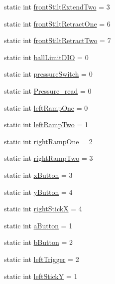 \begin{DoxyCompactItemize}
\item 
static int \hyperlink{classfrc_1_1robot_1_1_robot_map_adaf591568f35bfea428a0daef88d2bd7}{front\+Stilt\+Extend\+Two} = 3
\item 
static int \hyperlink{classfrc_1_1robot_1_1_robot_map_ac14d6b81afe55b4563fc122101e5d2a1}{front\+Stilt\+Retract\+One} = 6
\item 
static int \hyperlink{classfrc_1_1robot_1_1_robot_map_a5c84f2be7047952afe472026a81a71db}{front\+Stilt\+Retract\+Two} = 7
\item 
static int \hyperlink{classfrc_1_1robot_1_1_robot_map_a83f3eec03443af1dbe44492871796c92}{ball\+Limit\+D\+IO} = 0
\item 
static int \hyperlink{classfrc_1_1robot_1_1_robot_map_a845df2a269757c4988d8a7b4721ae9a6}{pressure\+Switch} = 0
\item 
static int \hyperlink{classfrc_1_1robot_1_1_robot_map_a10cc39db919c29133e2bc774281804b0}{Pressure\+\_\+read} = 0
\item 
static int \hyperlink{classfrc_1_1robot_1_1_robot_map_a628344048ec6bcb92c77be8e100d793a}{left\+Ramp\+One} = 0
\item 
static int \hyperlink{classfrc_1_1robot_1_1_robot_map_a8fe9ced14f786602722d0f571264364a}{left\+Ramp\+Two} = 1
\item 
static int \hyperlink{classfrc_1_1robot_1_1_robot_map_a5858c523e9d55496c5879e1605dd8d09}{right\+Ramp\+One} = 2
\item 
static int \hyperlink{classfrc_1_1robot_1_1_robot_map_a3b1dd0a30fea76ff6841bc16dca555ae}{right\+Ramp\+Two} = 3
\item 
static int \hyperlink{classfrc_1_1robot_1_1_robot_map_a563500240643659a777b4b64d648a57f}{x\+Button} = 3
\item 
static int \hyperlink{classfrc_1_1robot_1_1_robot_map_a376cdfce24713ccddfd9ea4a9ae83772}{y\+Button} = 4
\item 
static int \hyperlink{classfrc_1_1robot_1_1_robot_map_aed812a060e454b3406124a8a8ec95e15}{right\+StickX} = 4
\item 
static int \hyperlink{classfrc_1_1robot_1_1_robot_map_add774938fbf6b4cddcd06d376de27513}{a\+Button} = 1
\item 
static int \hyperlink{classfrc_1_1robot_1_1_robot_map_abb2f8a028f422a7e8713d4be96075ce2}{b\+Button} = 2
\item 
static int \hyperlink{classfrc_1_1robot_1_1_robot_map_a712cd18ea686d732a170689f16882f47}{left\+Trigger} = 2
\item 
static int \hyperlink{classfrc_1_1robot_1_1_robot_map_acad41677decf390f9afe83b7d5d93e86}{left\+StickY} = 1

\end{DoxyCompactItemize}
